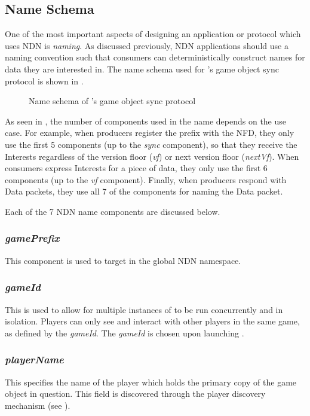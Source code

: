 \subsection{Name Schema}\label{sec:des:naming}
One of the most important aspects of designing an application or protocol which uses NDN is \textit{naming}. As discussed previously, NDN applications should use a naming convention such that consumers can deterministically construct names for data they are interested in. The name schema used for \game{}'s game object sync protocol is shown in .

\begin{figure}[H]
    \centering
    \caption{Name schema of \game{}'s game object sync protocol}
    \label{fig:des:sync-protocol-name}
\end{figure}

As seen in , the number of components used in the name depends on the use case. For example, when producers register the prefix with the NFD, they only use the first 5 components (up to the \textit{sync} component), so that they receive the Interests regardless of the version floor (\textit{vf}) or next version floor (\textit{nextVf}). When consumers express Interests for a piece of data, they only use the first 6 components (up to the \textit{vf} component). Finally, when producers respond with Data packets, they use all 7 of the components for naming the Data packet.

Each of the 7 NDN name components are discussed below.

\subsubsection{\textit{gamePrefix}}
This component is used to target \game{} in the global NDN namespace.

\subsubsection{\textit{gameId}}
This is used to allow for multiple instances of \game{} to be run concurrently and in isolation. Players can only see and interact with other players in the same game, as defined by the \textit{gameId}. The \textit{gameId} is chosen upon launching \game{}.

\subsubsection{\textit{playerName}}
This specifies the name of the player which holds the primary copy of the game object in question. This field is discovered through the player discovery mechanism (see ).

